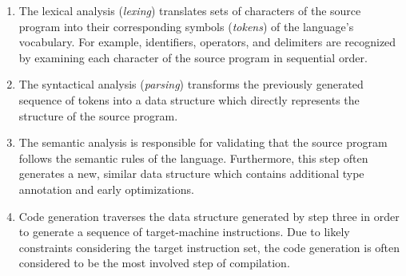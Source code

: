 \begin{enumerate}
	\item The lexical analysis (\emph{lexing}) translates sets of characters of the source program
	      into their corresponding symbols (\emph{tokens}) of the language's vocabulary.
	      For example, identifiers, operators, and delimiters are recognized
	      by examining each character of the source program in sequential order.
	\item The syntactical analysis (\emph{parsing}) transforms the previously generated sequence of tokens
	      into a data structure which directly represents the structure of the source program.
	\item The semantic analysis is responsible for validating
	      that the source program follows the semantic rules of the language.
	      Furthermore, this step often generates a new, similar data structure which contains additional type annotation and early optimizations.
	\item Code generation traverses the data structure generated by step three
	      in order to generate a sequence of target-machine instructions.
	      Due to likely constraints considering the target instruction set,
	      the code generation is often considered to be the most involved step of compilation.
\end{enumerate}
\cite[p.~6]{wirth_compiler_construction_2005}

